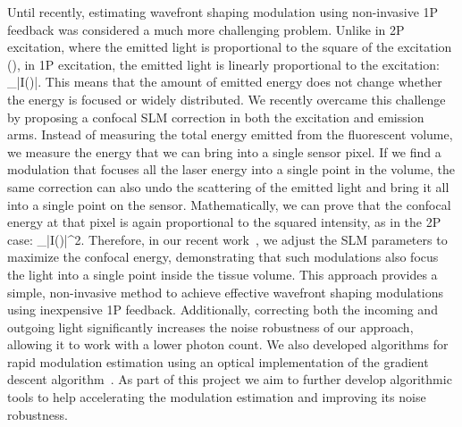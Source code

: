Until recently, estimating wavefront shaping modulation using non-invasive 1P feedback was considered a much more challenging problem. Unlike in 2P excitation, where the emitted light is proportional to the square of the excitation (), in 1P excitation, the emitted light is linearly proportional to the excitation:
\BE\label{eq:emitted-power-1P}
\int_\ptd |I(\ptd)|.
\EE
This means that the amount of emitted energy does not change whether the energy is focused or widely distributed. We recently overcame this challenge~\cite{DrorNatureComm24} by proposing a confocal SLM correction in both the excitation and emission arms. Instead of measuring the total energy emitted from the fluorescent volume, we measure the energy that we can bring into a single sensor pixel. If we find a modulation that focuses all the laser energy into a single point in the volume, the same correction can also undo the scattering of the emitted light and bring it all into a single point on the sensor. Mathematically, we can prove that the confocal energy at that pixel is again proportional to the squared intensity, as in the 2P case:
\BE\label{eq:emitted-power-1P-conf}
\int_\ptd |I(\ptd)|^2.
\EE
Therefore, in our recent work~\cite{DrorNatureComm24}, we adjust the SLM parameters to maximize the confocal energy, demonstrating that such modulations also focus the light into a single point inside the tissue volume. This approach provides a simple, non-invasive method to achieve effective wavefront shaping modulations using inexpensive 1P feedback. Additionally, correcting both the incoming and outgoing light significantly increases the noise robustness of our approach, allowing it to work with a lower photon count. We also developed algorithms for rapid modulation estimation using an optical implementation of the gradient descent algorithm~\cite{monin2025rapidwavefrontshapingusing}. As part of this project we aim to further develop  algorithmic tools to help accelerating the modulation estimation and improving its noise robustness.


